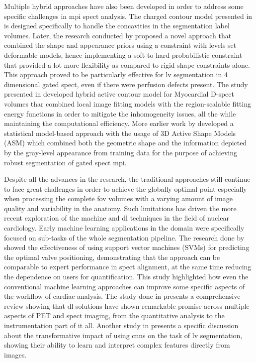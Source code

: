 Multiple hybrid approaches have also been developed in order to address some specific challenges in \gls{mpi} \gls{spect} analysis. The charged contour model presented in \cite{Yang2006ACC} is designed specifically to handle the concavities in the segmentation label volumes. Later, the research conducted by \cite{https://doi.org/10.1049/iet-cvi.2012.0081} proposed a novel approach that combined the shape and appearance priors using a constraint with levels set deformable models, hence implementing a soft-to-hard probabilistic constraint that provided a lot more flexibility as compared to rigid shape constraints alone. This approach proved to be particularly effective for \gls{lv} segmentation in 4 dimensional gated \gls{spect}, even if there were perfusion defects present. The study presented in \cite{8409947} developed hybrid active contour model for Myocardial D-\gls{spect} volumes thar combined local image fitting models with the region-scalable fitting energy functions in order to mitigate the inhomogeneity issues, all the while maintaining the computational efficiency. More earlier work by \cite{7123558} developed a statistical model-based approach with the usage of 3D Active Shape Models (ASM) which combined both the geometric shape and the information depicted by the gray-level appearance from training data for the purpose of achieving robust segmentation of gated \gls{spect} \gls{mpi}.

Despite all the advances in the research, the traditional approaches still continue to face great challenges in order to achieve the globally optimal point especially when processing the complete \gls{fov} volumes with a varying amount of image quality and variability in the anatomy. Such limitations has driven the more recent exploration of the machine and \gls{dl} techniques in the field of nuclear cardiology. Early machine learning applications in the domain were specifically focused on sub-tasks of the whole segmentation pipeline. The research done by \cite{Betancur2017} showed the effectiveness of using support vector machines (SVMs) for predicting the optimal valve positioning, demonstrating that the approach can be comparable to expert performance in \gls{spect} alignment, at the same time reducing the dependence on users for quantification. This study highlighted how even the conventional machine learning approaches can improve some specific aspects of the workflow of cardiac analysis. The study done in \cite{ARABI2021122} presents a comprehensive review showing that \gls{dl} solutions have shown remarkable promise across multiple aspects of PET and \gls{spect} imaging, from the quantitative analysis to the instrumentation part of it all. Another study in \cite{WOLTERINK2020988} presents a specific discussion about the transformative impact of using \gls{cnn}s on the task of \gls{lv} segmentation, showing their ability to learn and interpret complex features directly from images. 

